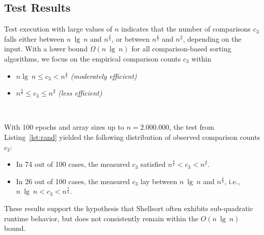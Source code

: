 \subsection{Test Results}

Test execution with large values of $n$ indicates that the number of comparisons $c_3$ falls either between $n\ \lg\ n$ and $n^{\frac{4}{3}}$, or between $n^{\frac{4}{3}}$ and $n^2$, depending on the input.
With a lower bound $\Omega(n\ \lg\ n)$ for all comparison-based sorting algorithms, we focus on the empirical comparison counts $c_3$ within

\begin{itemize}
    \item $n \lg\ n \leq c_3 < n^{\frac{4}{3}}$ \textit{(moderately efficient)}
    \item $n^{\frac{4}{3}} \leq c_3 \leq n^2$ \textit{(less efficient)}
\end{itemize}\\
\vspace{2mm}

With 100 epochs and array sizes up to $n = 2.000.000$, the test from Listing~\ref{lst:rand} yielded the following distribution of observed comparison counts $c_3$:

\begin{itemize}
    \item In 74 out of 100 cases, the measured $c_3$ satisfied $n^{\frac{4}{3}} < c_3 < n^2$.
    \item In 26 out of 100 cases, the measured $c_3$ lay between $n\ \lg\ n$ and $n^{\frac{4}{3}}$, i.e., $n\ \lg\ n < c_3 < n^{\frac{4}{3}}$.
\end{itemize}

These results support the hypothesis that Shellsort often exhibits sub-quadratic runtime behavior, but does not consistently remain within the $O(n\ \lg\ n)$ bound.



